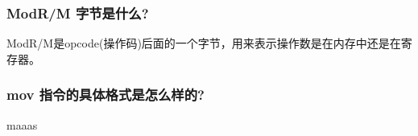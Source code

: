 \documentclass[UTF8,a4paper,10pt]{ctexart}
\begin{document}
\subsubsection{ModR/M 字节是什么?}
ModR/M是opcode(操作码)后面的一个字节，用来表示操作数是在内存中还是在寄存器。
\subsubsection{mov 指令的具体格式是怎么样的?}
maaas





\end{document}
